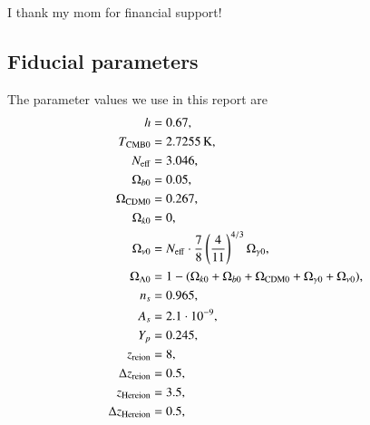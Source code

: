 \begin{acknowledgements}
      I thank my mom for financial support!
\end{acknowledgements}




% 


\begin{appendix}
\section{Fiducial parameters} \label{app:M1:fiducial_parameters}
The parameter values we use in this report are 
\begin{equation} \label{eq:Appendix:Fiducial_cosmology_parameters}
      \begin{split}
            h &= 0.67, \\ 
            T_\mathrm{CMB0} &= 2.7255\,\mathrm{K}, \\
            N_\mathrm{eff} &= 3.046, \\
            \Omega_{b0} &= 0.05, \\
            \Omega_\mathrm{CDM0} &= 0.267,\\
            \Omega_{k0} &=0,\\
            \Omega_{\nu 0} &= N_\mathrm{eff} \cdot \frac{7}{8} \left( \frac{4}{11} \right)^{4/3} \Omega_{\gamma 0}, \\
            \Omega_{\Lambda 0} &= 1 - (\Omega_{k0} + \Omega_{b0} + \Omega_\mathrm{CDM0} + \Omega_{\gamma 0} + \Omega_{\nu 0}), \\
            n_s &= 0.965,\\
            A_s &= 2.1\cdot 10^{-9},\\
            Y_p &= 0.245, \\
            z_\mathrm{reion} &= 8, \\
            \Delta z_\mathrm{reion} &= 0.5, \\
            z_\mathrm{Hereion} &= 3.5, \\
            \Delta z_\mathrm{Hereion} &= 0.5, \\
      \end{split}
\end{equation}


\end{appendix}


